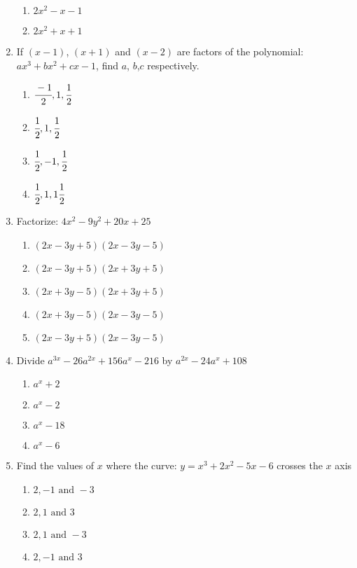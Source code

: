 \begin{multicols}{2}
\begin{enumerate}[label={\arabic*.}]
\begin{enumerate}[label={\Alph*.}]
        \item \(2x^2-x-1\)
        \item \(2x^2 +x + 1\)
      \end{enumerate}
    \item If \((x-1)\), \((x+1)\) and \((x-2)\) are factors of the polynomial: $ax^3 + bx^2 +cx -1$, find \(a\), \(b\),\(c\) respectively.
      \begin{enumerate}[label={\Alph*.}]
        \item \(\cfrac{-1}{2},1, \cfrac{1}{2}\)
        \item \(\cfrac{1}{2}, 1, \cfrac{1}{2}\)
        \item \(\cfrac{1}{2}, -1, \cfrac{1}{2}\)
        \item \(\cfrac{1}{2}, 1, 1\cfrac{1}{2}\)
      \end{enumerate}
    \item Factorize: $4x^2 - 9y^2 + 20x + 25 $
      \begin{enumerate}[label={\Alph*.}]
        \item \((2x - 3y + 5)(2x - 3y - 5)\)
        \item \((2x - 3y + 5)(2x + 3y + 5)\)
        \item \((2x + 3y - 5)(2x + 3y + 5)\)
        \item \((2x + 3y - 5)(2x - 3y - 5)\)
        \item \((2x - 3y + 5)(2x - 3y - 5)\)
      \end{enumerate}
    \item Divide $a^{3x} - 26a^{2x} + 156a^x - 216 $ by $a^{2x} - 24a^x + 108$
      \begin{enumerate}[label={\Alph*.}]
        \item \( a^x + 2\)
        \item \(a^x - 2\)
        \item \(a^x -18\)
        \item \(a^x -6\)
      \end{enumerate}
    \item Find the values of \(x\) where the curve: \(y = x^3 + 2x^2 - 5x - 6\) crosses the $x$ axis
      \begin{enumerate}[label={\Alph*.}]
        \item \(2, -1 \text{ and } -3\)
        \item \(2, 1 \text{ and } 3\)
        \item \(2, 1 \text{ and } -3\)
        \item \(2, -1 \text{ and } 3\)
      \end{enumerate}

\end{enumerate}
\end{multicols}

